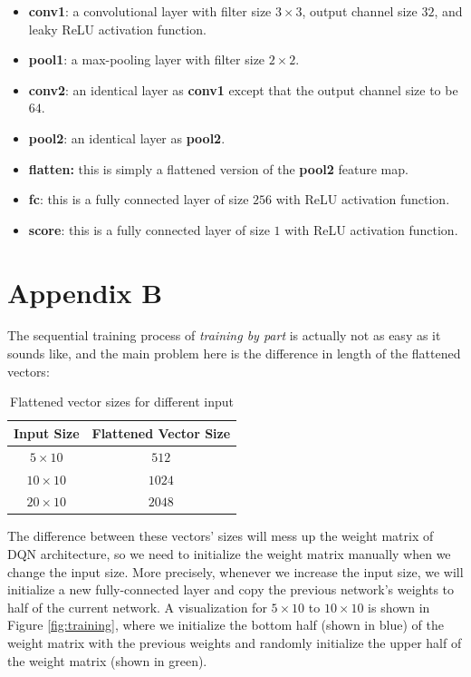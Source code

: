 \documentclass[letterpaper]{article} %
\begin{document}
\begin{itemize}
  \item 
  {\bf conv1}: a convolutional layer with filter size $3\times 3$, output channel size $32$, and leaky ReLU activation function.
  \item 
  {\bf pool1}: a max-pooling layer with filter size $2\times 2$.
  \item 
  {\bf conv2}: an identical layer as {\bf conv1} except that the output channel size to be $64$.
  \item 
  {\bf pool2}: an identical layer as {\bf pool2}.  
  \item 
  {\bf flatten:} this is simply a flattened version of the {\bf pool2} feature map.
  \item 
  {\bf fc}: this is a fully connected layer of size $256$ with ReLU activation function.
  \item 
  {\bf score}: this is a fully connected layer of size $1$ with ReLU activation function.
\end{itemize}

\newpage
\section{Appendix B}

  The sequential training process of \textit{training by part} is actually not as easy as it sounds like, and the main problem here is the difference in length of the flattened vectors:

  \begin{table}[h!]
    \centering
    \normalsize{
      \begin{tabular}{ |c|c| } 
        \hline
        Input Size & Flattened Vector Size  \\ 
        \hline
          $5\times 10$ & $512$  \\ 
          \hline
          $10\times 10$ & $1024$  \\ 
          \hline
          $20\times 10$ & $2048$  \\
          \hline
        \end{tabular}}
    \caption{Flattened vector sizes for different input}
    \label{tab:vectorSize}
  \end{table} 

  The difference between these vectors' sizes will mess up the weight matrix of DQN architecture, so we need to initialize the weight matrix manually when we change the input size. More precisely, whenever we increase the input size, we will initialize a new fully-connected layer and copy the previous network's weights to half of the current network. A visualization for $5\times 10$ to $10\times 10$ is shown in Figure \ref{fig:training}, where we initialize the bottom half (shown in blue) of the weight matrix with the previous weights and randomly initialize the upper half of the weight matrix (shown in green).
\end{document}
